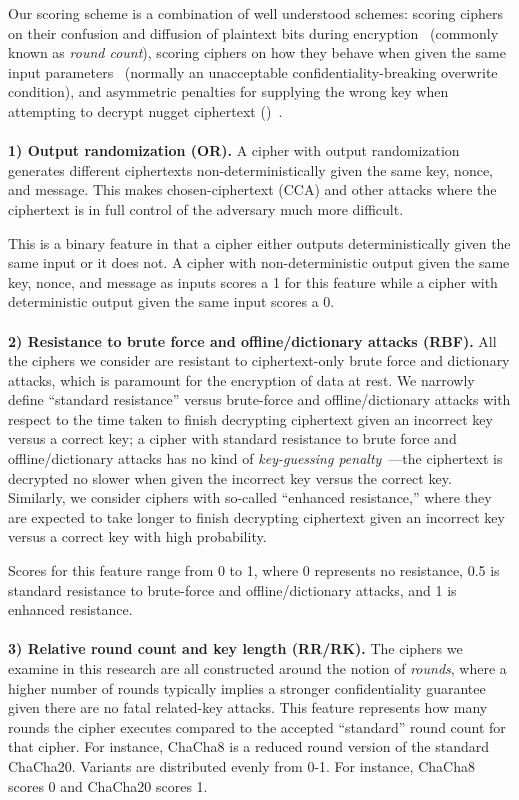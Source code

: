 Our scoring scheme is a combination of well understood schemes: scoring ciphers
on their confusion and diffusion of plaintext bits during
encryption~\cite{MicrosoftCryptanalysisAES,SchneiersOnRounds} (commonly known as
\emph{round count}), scoring ciphers on how they behave when given the same
input parameters~\cite{random-output1,Freestyle,random-output2} (normally an
unacceptable confidentiality-breaking overwrite condition), and asymmetric
penalties for supplying the wrong key when attempting to decrypt nugget
ciphertext ()~\cite{scrypt,Freestyle,others2}.\\
\\
\textbf{1) Output randomization (OR).} A cipher with output randomization
generates different ciphertexts non-deterministically given the same key, nonce,
and message. This makes chosen-ciphertext (CCA) and other attacks where the
ciphertext is in full control of the adversary much more difficult.

This is a binary feature in that a cipher either outputs deterministically given
the same input or it does not. A cipher with non-deterministic output given the
same key, nonce, and message as inputs scores a 1 for this feature while a
cipher with deterministic output given the same input scores a 0.\\
\\
\textbf{2) Resistance to brute force and offline/dictionary attacks (RBF).}
All the ciphers we consider are resistant to ciphertext-only brute force and
dictionary attacks, which is paramount for the encryption of data at rest. We
narrowly define ``standard resistance'' versus brute-force and
offline/dictionary attacks with respect to the time taken to finish decrypting
ciphertext given an incorrect key versus a correct key; a cipher with standard
resistance to brute force and offline/dictionary attacks has no kind of
\emph{key-guessing penalty}~\cite{Freestyle}---the ciphertext is decrypted no
slower when given the incorrect key versus the correct key. Similarly, we
consider ciphers with so-called ``enhanced resistance,'' where they are expected
to take longer to finish decrypting ciphertext given an incorrect key versus a
correct key with high probability.

Scores for this feature range from 0 to 1, where 0 represents no resistance, 0.5
is standard resistance to brute-force and offline/dictionary attacks,
and 1 is enhanced resistance. \\
\\
\textbf{3) Relative round count and key length (RR/RK).} The ciphers we examine
in this research are all constructed around the notion of \emph{rounds}, where a
higher number of rounds typically implies a stronger confidentiality guarantee
given there are no fatal related-key attacks. This feature represents how many
rounds the cipher executes compared to the accepted ``standard'' round count for
that cipher. For instance, ChaCha8 is a reduced round version of the standard
ChaCha20. Variants are distributed evenly from 0-1. For instance, ChaCha8 scores
0 and ChaCha20 scores 1\@.

